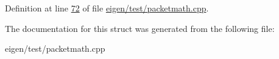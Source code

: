Definition at line \hyperlink{eigen_2test_2packetmath_8cpp_source_l00072}{72} of file \hyperlink{eigen_2test_2packetmath_8cpp_source}{eigen/test/packetmath.\+cpp}.



The documentation for this struct was generated from the following file\+:\begin{DoxyCompactItemize}
\item 
eigen/test/packetmath.\+cpp\end{DoxyCompactItemize}
